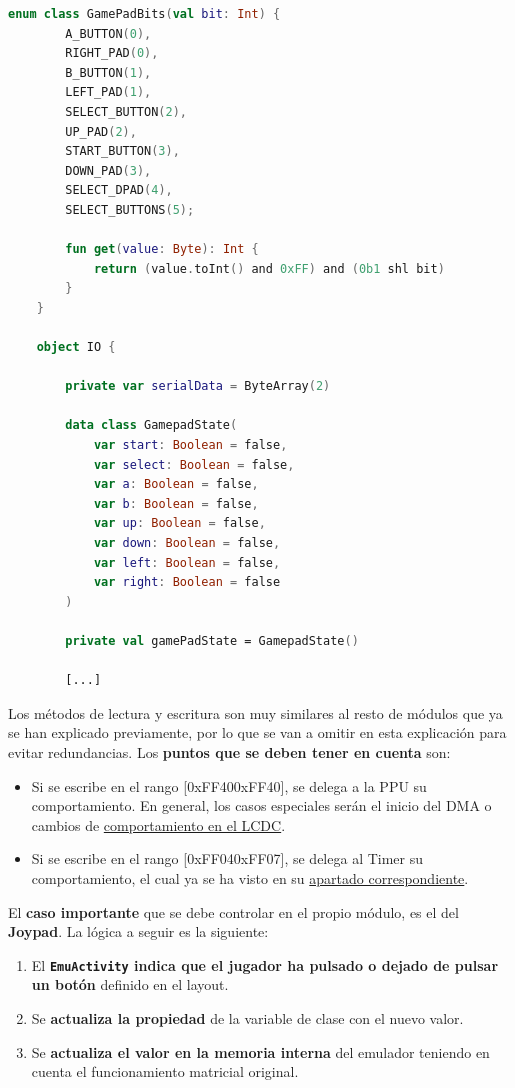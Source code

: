 \begin{lstlisting}[language=Kotlin, caption={Estados de los Botones en el Módulo IO.}, label={code:iojoypad}]
    enum class GamePadBits(val bit: Int) {
        A_BUTTON(0),
        RIGHT_PAD(0),
        B_BUTTON(1),
        LEFT_PAD(1),
        SELECT_BUTTON(2),
        UP_PAD(2),
        START_BUTTON(3),
        DOWN_PAD(3),
        SELECT_DPAD(4),
        SELECT_BUTTONS(5);

        fun get(value: Byte): Int {
            return (value.toInt() and 0xFF) and (0b1 shl bit)
        }
    }

    object IO {

        private var serialData = ByteArray(2)

        data class GamepadState(
            var start: Boolean = false,
            var select: Boolean = false,
            var a: Boolean = false,
            var b: Boolean = false,
            var up: Boolean = false,
            var down: Boolean = false,
            var left: Boolean = false,
            var right: Boolean = false
        )

        private val gamePadState = GamepadState()

        [...]
\end{lstlisting}

Los métodos de lectura y escritura son muy similares al resto de módulos que ya se han explicado previamente, por lo que se van a omitir en esta explicación para evitar redundancias. Los \textbf{puntos que se deben tener en cuenta} son:

\begin{itemize}
    \item Si se escribe en el rango [0xFF40\-0xFF40], se delega a la PPU su comportamiento. En general, los casos especiales serán el inicio del DMA o cambios de \hyperref[handleLCDC]{comportamiento en el LCDC}.
    \item Si se escribe en el rango [0xFF04\-0xFF07], se delega al Timer su comportamiento, el cual ya se ha visto en su \hyperref[writeToTimer]{apartado correspondiente}.
\end{itemize}

El \textbf{caso importante} que se debe controlar en el propio módulo, es el del \textbf{Joypad}. La lógica a seguir es la siguiente:

\begin{enumerate}
    \item El \textbf{\texttt{EmuActivity} indica que el jugador ha pulsado o dejado de pulsar un botón} definido en el layout.
    \item Se \textbf{actualiza la propiedad} de la variable de clase con el nuevo valor.
    \item Se \textbf{actualiza el valor en la memoria interna} del emulador teniendo en cuenta el funcionamiento matricial original.
\end{enumerate}

